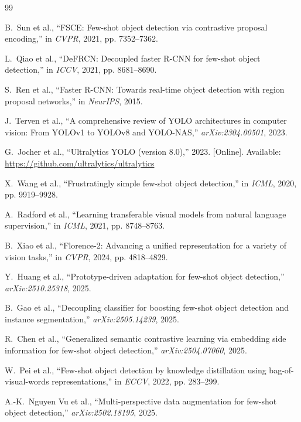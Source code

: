 \documentclass[conference]{IEEEtran}
\begin{document}
\begin{thebibliography}{99}

B.~Sun et al., ``FSCE: Few-shot object detection via contrastive proposal encoding,'' in \emph{CVPR}, 2021, pp. 7352--7362.

L.~Qiao et al., ``DeFRCN: Decoupled faster R-CNN for few-shot object detection,'' in \emph{ICCV}, 2021, pp. 8681--8690.

S.~Ren et al., ``Faster R-CNN: Towards real-time object detection with region proposal networks,'' in \emph{NeurIPS}, 2015.

J.~Terven et al., ``A comprehensive review of YOLO architectures in computer vision: From YOLOv1 to YOLOv8 and YOLO-NAS,'' \emph{arXiv:2304.00501}, 2023.

G.~Jocher et al., ``Ultralytics YOLO (version 8.0),'' 2023. [Online]. Available: \url{https://github.com/ultralytics/ultralytics}

X.~Wang et al., ``Frustratingly simple few-shot object detection,'' in \emph{ICML}, 2020, pp. 9919--9928.

A.~Radford et al., ``Learning transferable visual models from natural language supervision,'' in \emph{ICML}, 2021, pp. 8748--8763.

B.~Xiao et al., ``Florence-2: Advancing a unified representation for a variety of vision tasks,'' in \emph{CVPR}, 2024, pp. 4818--4829.

Y.~Huang et al., ``Prototype-driven adaptation for few-shot object detection,'' \emph{arXiv:2510.25318}, 2025.

B.~Gao et al., ``Decoupling classifier for boosting few-shot object detection and instance segmentation,'' \emph{arXiv:2505.14239}, 2025.

R.~Chen et al., ``Generalized semantic contrastive learning via embedding side information for few-shot object detection,'' \emph{arXiv:2504.07060}, 2025.

W.~Pei et al., ``Few-shot object detection by knowledge distillation using bag-of-visual-words representations,'' in \emph{ECCV}, 2022, pp. 283--299.

A.-K.~Nguyen Vu et al., ``Multi-perspective data augmentation for few-shot object detection,'' \emph{arXiv:2502.18195}, 2025.


\end{thebibliography}
\end{document}
